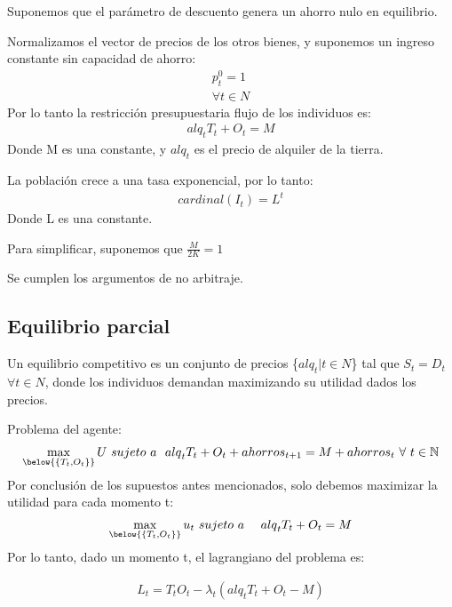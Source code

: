 \documentclass[12pt]{article}
\begin{document}
\item Suponemos que el parámetro  de descuento genera un ahorro nulo en equilibrio.

\item Normalizamos el vector de precios de los otros bienes, y suponemos un ingreso constante sin capacidad de ahorro:
\begin{align*}
p_{t}^{0}=1 \\   \forall t \in N
\end{align*}
Por lo tanto la restricción presupuestaria flujo de los individuos es:
\begin{align*}
alq_tT_t + O_t = M
\end{align*}
Donde M es una constante, y {$alq_t$} es el precio de alquiler de la tierra. 
\item La población crece a una tasa exponencial, por lo tanto:
\begin{align*}
cardinal(I_t) = L^t
\end{align*}
Donde L es una constante.
\item Para simplificar, suponemos que {$\frac{M}{2K} = 1$}
\item  Se cumplen los argumentos de no arbitraje.
\newpage
\subsection{Equilibrio parcial}
Un equilibrio competitivo es un conjunto de precios \{{$alq_t|t \in N$}\}  tal que {$S_t=D_t$} {$\forall t \in N$}, donde los individuos demandan maximizando su utilidad dados los precios.
\item Problema del agente:
\begin{align*}

\max_{\below{\left\{T_t,O_t\right\}}}{U}\ sujeto  \   a\ \ {alq}_tT_t+O_t+{ahorros}_{t+1}=M+{ahorros}_t\ \forall\ t\in\mathbb{N}

\end{align*}
Por conclusión de los supuestos antes mencionados, solo debemos maximizar la utilidad para cada momento t:
\begin{align*}

\max_{\below{\left\{T_t,O_t\right\}}}{u_t}\ sujeto \  a\ {\ \ \ alq}_tT_t+O_t=M

\end{align*}
Por lo tanto, dado un momento t, el lagrangiano del problema es:

\begin{align*}
L_t = T_tO_t - \lambda_{t}(alq_tT_t + O_t - M)
\end{align*}
\end{document}
